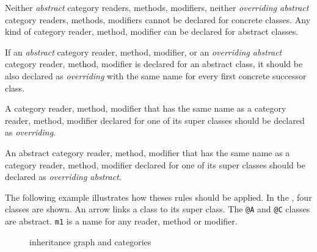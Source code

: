 Neither \emph{abstract} category readers, methods, modifiers, neither \emph{overriding abstract} category readers, methods, modifiers cannot be declared for concrete classes. Any kind of category reader, method, modifier can be declared for abstract classes.

If an \emph{abstract} category reader, method, modifier, or an \emph{overriding abstract} category reader, method, modifier is declared for an abstract class, it should be also declared as \emph{overriding} with the same name for every first concrete successor class.

A category reader, method, modifier that has the same name as a category reader, method, modifier declared for one of its super classes should be declared as \emph{overriding}.

An abstract category reader, method, modifier that has the same name as a category reader, method, modifier declared for one of its super classes should be declared as \emph{overriding abstract}.

The following example illustrates how theses rules should be applied. In the , four classes are shown. An arrow links a class to its super class. The \lstinline[language=galgas]!@A! and \lstinline[language=galgas]!@C! classes are abstract. \lstinline[language=galgas]!m1! is a name for any reader, method or modifier.

\begin{figure}[t]
  \centering
  \caption{inheritance graph and categories}
  \ligne
\end{figure}

